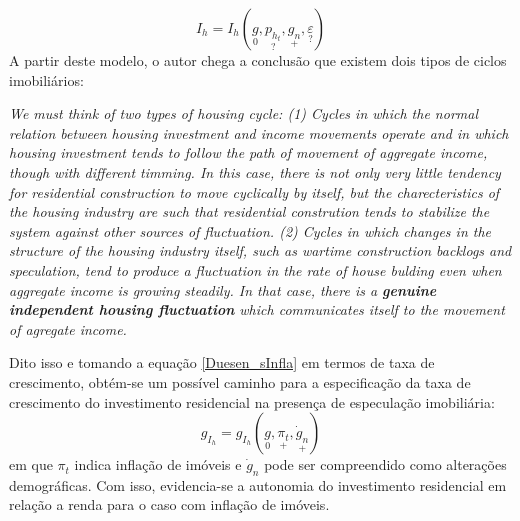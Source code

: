 \begin{equation}
\label{Duesen_sInfla}
I_h = I_h(\underset{0}{g}, \underset{?}{p_{h_t}}, \underset{+}{g_n}, \underset{?}{\varepsilon})
\end{equation}
A partir deste modelo, o autor chega a conclusão que existem dois tipos de ciclos imobiliários:
\begin{citacao}
\textit{We must think of two types of housing cycle: (1) Cycles in which the normal relation between housing investment and income movements operate and  in which housing investment tends to follow the path of movement of aggregate income, though with different timming.
In this case, there is not only very little tendency for residential construction to move cyclically by itself, but the charecteristics of the housing industry are such that residential constrution tends to  stabilize the system against other sources of fluctuation.
(2) Cycles in which changes in the structure of the housing industry itself, such as wartime construction backlogs and speculation, tend to produce a fluctuation in the rate of house bulding even when aggregate income is growing steadily. 
In that case, there is a \textbf{genuine independent housing fluctuation} which communicates itself to the movement of agregate income.}
\cite[p.~164. grifos adicionados]{duesenberry_investment_1958}
\end{citacao}
Dito isso e tomando a equação \ref{Duesen_sInfla} em termos de taxa de crescimento, obtém-se um possível caminho para a especificação da taxa de crescimento do investimento residencial na presença de especulação imobiliária:
\begin{equation}
\label{gZ_Duesenberry}
g_{I_h} = g_{I_h}(\underset{0}{g}, \underset{+}{\pi_t}, \underset{+}{\dot g_n})
\end{equation}
em que $\pi_t$ indica inflação de imóveis e $\dot g_n$ pode ser compreendido como alterações demográficas.
Com isso, evidencia-se a autonomia do investimento residencial em relação a renda para o caso com inflação de imóveis.


